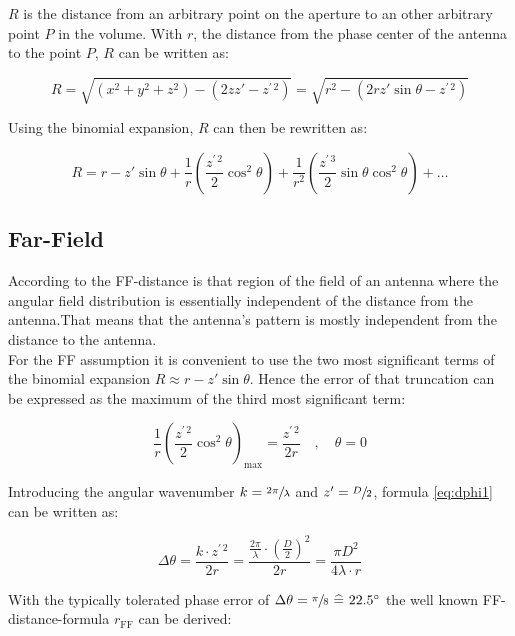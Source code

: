 $R$ is the distance from an arbitrary point on the aperture to an other arbitrary point $P$ in the volume. With $r$, the distance from the phase center of the antenna to the point $P$, $R$ can be written as: \cite{balanis}

\begin{equation}
R = \sqrt{\left(x^2+y^2+z^2\right)-\left(2zz'-z^{\prime\, 2}\right)}=\sqrt{r^2-\left(2rz'\sin \theta -z^{\prime\, 2}\right)}
\end{equation}

Using the binomial expansion, $R$ can then be rewritten as:

\begin{equation}
R = r - z'\sin\theta + \frac{1}{r}\left(\frac{z^{\prime\, 2}}{2}\cos ^2 \theta\right) + \frac{1}{r^2}\left(\frac{z^{\prime\, 3}}{2}\sin\theta\cos^2\theta\right) + \dots
\end{equation}

\subsection{Far-Field}

According to \cite{balanis} the \ac{FF}-distance is \glqq that region of the field of an antenna where the angular field distribution is essentially independent of the distance from the antenna.\grqq{ }That means that the antenna's pattern is mostly independent from the distance to the antenna.\\
For the \ac{FF} assumption it is convenient to use the two most significant terms of the binomial expansion $R\approx r - z'\sin\theta$. Hence the error of that truncation can be expressed as the maximum of the third most significant term:

\begin{equation}
\frac{1}{r}\left(\frac{z^{\prime\, 2}}{2}\cos ^2 \theta\right)_\text{max} = \frac{z^{\prime\, 2}}{2r} \quad , \quad \theta = 0
\label{eq:dphi1}
\end{equation}

Introducing the angular wavenumber $k=\sfrac{2\pi}{\lambda}$ and $z'=\sfrac{D}{2}$, formula \ref{eq:dphi1} can be written as:


\begin{equation}
\Delta\theta = \frac{k\cdot z^{\prime\, 2}}{2r} =\frac{\frac{2\pi}{\lambda}\cdot \left(\frac{D}{2}\right)^2}{2r} = \frac{\pi D^2}{4\lambda\cdot r}
\end{equation}

With the typically tolerated phase error of $\Delta\theta = \sfrac{\pi}{8} \ \widehat{=}\  22.5^\circ$ the well known \ac{FF}-distance-formula $r_{\text{FF}}$ can be derived:

